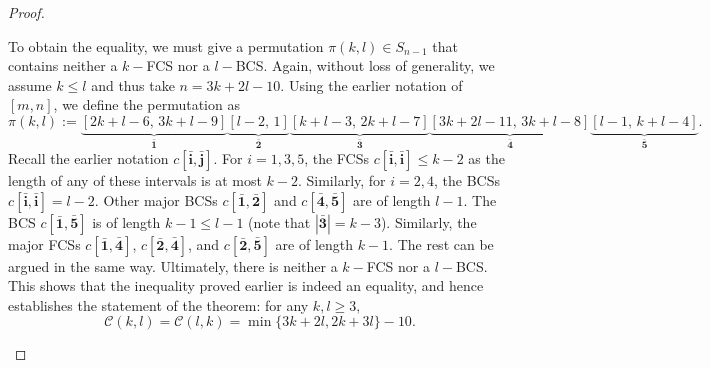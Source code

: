 \documentclass[11pt, a4paper]{article}
\theoremstyle{compact}
\begin{document}
\begin{proof}
\begin{enumerate}
\[    \]
    To obtain the equality, we must give a permutation $\pi(k,l) \in S_{n-1}$ that contains neither a $k-$FCS nor a $l-$BCS. Again, without loss of generality, we assume $k\leq l$ and thus take $n = 3k + 2l -10$. Using the earlier notation of $[m,n]$, we define the permutation as 
    \[
    \pi(k,l) := \underbrace{[2k+l-6,\, 3k+l-9]}_\text{$\bar{\mathbf{1}}$} \underbrace{[l-2, \, 1]}_\text{$\bar{\mathbf{2}}$}\underbrace{[k+l-3, \, 2k + l - 7]}_\text{$\bar{\mathbf{3}}$}\underbrace{[3k + 2l -11, \, 3k + l - 8]}_\text{$\bar{\mathbf{4}}$}\underbrace{[l-1, \, k + l -4]}_\text{$\bar{\mathbf{5}}$}.
    \]
    Recall the earlier notation $c[\bar{\mathbf{i}}, \bar{\mathbf{j}}]$. For $i = 1,3,5$, the FCSs $c[\bar{\mathbf{i}}, \bar{\mathbf{i}}] \leq k -2 $ as the length of any of these intervals is at most $k -2$. Similarly, for $i=2,4$, the BCSs $ c[\bar{\mathbf{i}}, \bar{\mathbf{i}}] = l -2  $. Other major BCSs $c[\bar{\mathbf{1}}, \bar{\mathbf{2}}]$ and $c[\bar{\mathbf{4}}, \bar{\mathbf{5}}]$ are of length $l-1$. The BCS $c[\bar{\mathbf{1}}, \bar{\mathbf{5}}] $ is of length $k-1 \leq l-1$ (note that $|\bar{\mathbf{3}}|=k-3$). Similarly, the major FCSs $c[\bar{\mathbf{1}}, \bar{\mathbf{4}}] $, $c[\bar{\mathbf{2}}, \bar{\mathbf{4}}] $, and $c[\bar{\mathbf{2}}, \bar{\mathbf{5}}] $ are of length $k-1$. The rest can be argued in the same way. Ultimately, there is neither a $k-$FCS nor a $l-$BCS. \\
    This shows that the inequality proved earlier is indeed an equality, and hence establishes the statement of the theorem: for any $k,l \geq 3,$ 
    \[
     \mathcal{C}(k,l) = \mathcal{C}(l,k)  = \min \{ 3k + 2l, 2k + 3l\} - 10.
    \]\end{enumerate}
\end{proof}
\end{document}

